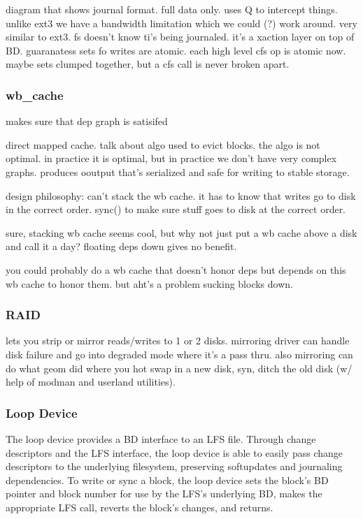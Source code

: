 diagram that shows journal format. full data only. uses Q to intercept
things. unlike ext3 we have a bandwidth limitation which we could (?)
work around. very similar to ext3. fs doesn't know ti's being
journaled. it's a xaction layer on top of BD. guaranatess sets fo
writes are atomic. each high level cfs op is atomic now. maybe sets
clumped together, but a cfs call is never broken apart.

\subsubsection{wb\_cache}

makes sure that dep graph is satisifed

direct mapped cache. talk about algo used to evict blocks. the algo is
not optimal. in practice it is optimal, but in practice we don't have
very complex graphs. produces ooutput that's serialized and safe for
writing to stable storage.

design philosophy: can't stack the wb cache. it has to know that
writes go to disk in the correct order. sync() to make sure stuff goes
to disk at the correct order.

sure, stacking wb cache seems cool, but why not just put a wb cache
above a disk and call it a day? floating deps down gives no benefit.

you could probably do a wb cache that doesn't honor deps but depends
on this wb cache to honor them. but aht's a problem sucking blocks
down.

\subsubsection{RAID}
\label{sec:solution:impl:raid}

lets you strip or mirror reads/writes to 1 or 2 disks. mirroring
driver can handle disk failure and go into degraded mode where it's a
pass thru. also mirroring can do what geom did where you hot swap in a
new disk, syn, ditch the old disk (w/ help of modman and userland
utilities).

\subsubsection{Loop Device}
\label{sec:solution:impl:loop}

The loop device provides a BD interface to an LFS file. Through change
descriptors and the LFS interface, the loop device is able to easily
pass change descriptors to the underlying filesystem, preserving
softupdates and journaling dependencies. To write or sync a block, the
loop device sets the block's BD pointer and block number for use by
the LFS's underlying BD, makes the appropriate LFS call, reverts the
block's changes, and returns.


